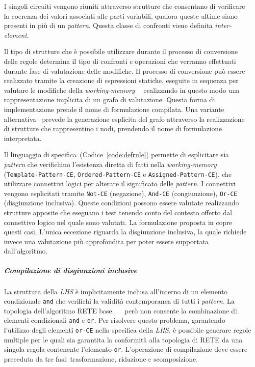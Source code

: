 I singoli circuiti vengono riuniti attraverso strutture che consentano di verificare la coerenza dei valori associati alle parti variabili, qualora queste ultime siano presenti in più di un \emph{pattern}. Questa classe di confronti viene definita \emph{inter-element}.

Il tipo di strutture che è possibile utilizzare durante il processo di conversione delle regole determina il tipo di confronti e operazioni che verranno effettuati durante fase di valutazione delle modifiche. Il processo di conversione può essere realizzato tramite la creazione di espressioni statiche, eseguite in sequenza per valutare le modifiche della \emph{working-memory}~\cite{forgy1979}~\cite{forgy1982} realizzando in questo modo una rappresentazione implicita di un grafo di valutazione. Questa forma di implementazione prende il nome di formulazione compilata. Una variante alternativa~\cite{Doorenbos95productionmatching} prevede la generazione esplicita del grafo attraverso la realizzazione di strutture che rappresentino i nodi, prendendo il nome di formulazione interpretata.

Il linguaggio di specifica~(Codice~\ref{code:defrule}) permette di esplicitare sia \emph{pattern} che verifichino l'esistenza diretta di fatti nella \emph{working-memory} (\texttt{Template\--Pattern\--CE}, \texttt{Ordered-Pattern-CE} e \texttt{Assigned-Pattern-CE}), che utilizzare connettivi logici per alterare il significato delle \emph{pattern}. I connettivi vengono esplicitati tramite \texttt{Not-CE} (negazione), \texttt{And-CE} (congiunzione), \texttt{Or-CE} (disgiunzione inclusiva). Queste condizioni possono essere valutate realizzando strutture apposite che eseguano i test tenendo conto del contesto offerto dal connettivo logico nel quale sono valutati. La formulazione proposta in \cite{Doorenbos95productionmatching} copre questi casi.
L'unica eccezione riguarda la disgiunzione inclusiva, la quale richiede invece una valutazione più approfondita per poter essere supportata dall'algoritmo.

\subparagraph{Compilazione di disgiunzioni inclusive}

La struttura della \emph{LHS} è implicitamente inclusa all'interno di un elemento condizionale \texttt{and} che verifichi la validità contemporanea di tutti i \emph{pattern}. La topologia dell'algoritmo RETE base~\cite{forgy1979}~\cite{forgy1982}~\cite{Doorenbos95productionmatching} però non consente la combinazione di elementi condizionali \texttt{and} e \texttt{or}. Per risolvere questo problema, garantendo l'utilizzo degli elementi \texttt{or-CE} nella specifica della \emph{LHS}, è possibile generare regole multiple per le quali sia garantita la conformità alla topologia di RETE da una singola regola contenente l'elemento \texttt{or}. 
L'operazione di compilazione deve essere preceduta da tre fasi: trasformazione, riduzione e scomposizione.

